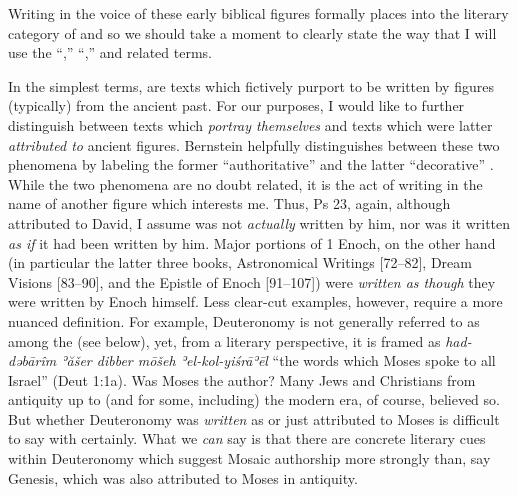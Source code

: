  Writing in the voice of these early biblical figures formally places \ga into the literary category of \psy and so we should take a moment to clearly state the way that I will use the ``\psy,'' ``\psa,'' and related terms.\autocites[The topic of \psy has received a large amount of very sophisticated attention in recent years. See especially][]{mroczek2016}{tigchelaar_tigchelaar2014}{reed_towsend-moulie2011}{reed_jts2009}{reed_ditomasso-turcescu2008}{najman_hilhorst-puech2007}{najman2003}

 In the simplest terms, \psa are texts which fictively purport to be written by figures (typically) from the ancient past. For our purposes, I would like to further distinguish between texts which \emph{portray themselves} and texts which were latter \emph{attributed to} ancient figures. Bernstein helpfully distinguishes between these two phenomena by labeling the former ``authoritative'' \psy and the latter ``decorative'' \psy.\autocite[He also identifies a third form, ``convenient'' \psy which is located somewhere between the two. I do not find this category as helpful.][3--7]{bernstein_chazon-etal1999} While the two phenomena are no doubt related, it is the act of writing in the name of another figure which interests me. Thus, Ps 23, again, although attributed to David, I assume was not \emph{actually} written by him, nor was it written \emph{as if} it had been written by him. Major portions of 1 Enoch, on the other hand (in particular the latter three books, Astronomical Writings {[}72--82{]}, Dream Visions {[}83--90{]}, and the Epistle of Enoch {[}91--107{]}) were \emph{written as though} they were written by Enoch himself. Less clear-cut examples, however, require a more nuanced definition. For example, Deuteronomy is not generally referred to as among the \psa (see below), yet, from a literary perspective, it is framed as \emph{had-dəbārîm ʾăšer dibber mōšeh ʾel-kol-yiśrāʾēl} ``the words which Moses spoke to all Israel'' (Deut 1:1a). Was Moses the author? Many Jews and Christians from antiquity up to (and for some, including) the modern era, of course, believed so. But whether Deuteronomy was \emph{written} as \psa or just attributed to Moses is difficult to say with certainly. What we \emph{can} say is that there are concrete literary cues within Deuteronomy which suggest Mosaic authorship more strongly than, say Genesis, which was also attributed to Moses in antiquity.

